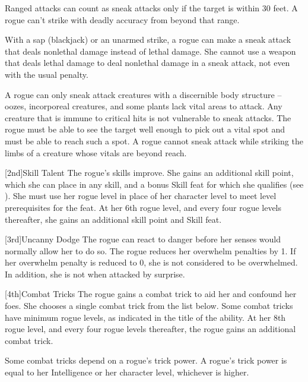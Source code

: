         \par Ranged attacks can count as sneak attacks only if the target is within 30 feet.
        A rogue can't strike with deadly accuracy from beyond that range.

        With a sap (blackjack) or an unarmed strike, a rogue can make a sneak attack that deals nonlethal damage instead of lethal damage.
        She cannot use a weapon that deals lethal damage to deal nonlethal damage in a sneak attack, not even with the usual  penalty.

        A rogue can only sneak attack creatures with a discernible body structure -- oozes, incorporeal creatures, and some plants lack vital areas to attack.
        Any creature that is immune to critical hits is not vulnerable to sneak attacks.
        The rogue must be able to see the target well enough to pick out a vital spot and must be able to reach such a spot.
        A rogue cannot sneak attack while striking the limbs of a creature whose vitals are beyond reach.

        [2nd]{Skill Talent}
        The rogue's skills improve.
        She gains an additional skill point, which she can place in any skill, and a bonus Skill feat for which she qualifies (see ).
        She must use her rogue level in place of her character level to meet level prerequisites for the feat.
        At her 6th rogue level, and every four rogue levels thereafter, she gains an additional skill point and Skill feat.

        [3rd]{Uncanny Dodge}
        The rogue can react to danger before her senses would normally allow her to do so.
        The rogue reduces her overwhelm penalties by 1.
        If her overwhelm penalty is reduced to 0, she is not considered to be overwhelmed.
        In addition, she is not \unaware when attacked by surprise.

        [4th]{Combat Tricks}
        The rogue gains a combat trick to aid her and confound her foes.
        She chooses a single combat trick from the list below.
        Some combat tricks have minimum rogue levels, as indicated in the title of the ability.
        At her 8th rogue level, and every four rogue levels thereafter, the rogue gains an additional combat trick.

        Some combat tricks depend on a rogue's trick power.
        A rogue's trick power is equal to her Intelligence or her character level, whichever is higher.

